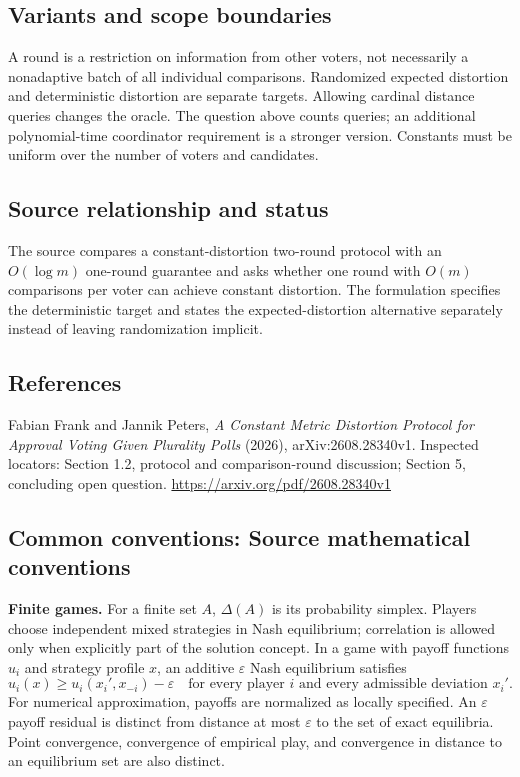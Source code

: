 \documentclass[11pt,a4paper]{article}
\begin{document}
\subsection*{Variants and scope boundaries}
A round is a restriction on information from other voters, not necessarily a nonadaptive batch of all individual comparisons. Randomized expected distortion and deterministic distortion are separate targets. Allowing cardinal distance queries changes the oracle. The question above counts queries; an additional polynomial-time coordinator requirement is a stronger version. Constants must be uniform over the number of voters and candidates.

\subsection*{Source relationship and status}
The source compares a constant-distortion two-round protocol with an $O(\log m)$ one-round guarantee and asks whether one round with $O(m)$ comparisons per voter can achieve constant distortion. The formulation specifies the deterministic target and states the expected-distortion alternative separately instead of leaving randomization implicit.

\subsection*{References}
\begingroup\footnotesize\raggedright
\noindent [S1] Fabian Frank and Jannik Peters, \emph{A Constant Metric Distortion Protocol for Approval Voting Given Plurality Polls} (2026), arXiv:2608.28340v1. Inspected locators: Section 1.2, protocol and comparison-round discussion; Section 5, concluding open question.
\url{https://arxiv.org/pdf/2608.28340v1}
\par\endgroup

\subsection*{Common conventions: Source mathematical conventions}

\textbf{Finite games.} For a finite set $A$, $\Delta(A)$ is its probability
simplex. Players choose independent mixed strategies in Nash equilibrium;
correlation is allowed only when explicitly part of the solution concept.
In a game with payoff functions $u_i$ and strategy profile $x$, an additive
$\varepsilon$ Nash equilibrium satisfies
\[
 u_i(x)\geq u_i(x_i',x_{-i})-\varepsilon
 \quad\text{for every player $i$ and every admissible deviation $x_i'$}.
\]
For numerical approximation, payoffs are normalized as locally specified.
An $\varepsilon$ payoff residual is distinct from distance at most
$\varepsilon$ to the set of exact equilibria. Point convergence, convergence
of empirical play, and convergence in distance to an equilibrium set are
also distinct.
\end{document}
